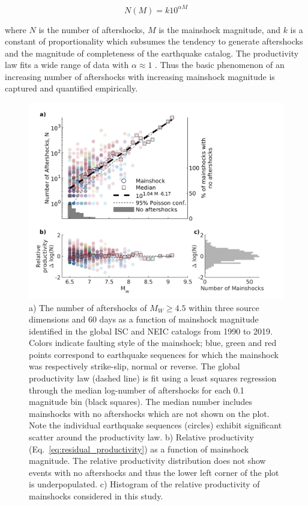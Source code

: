 \documentclass[draft]{agujournal2018}
\begin{document}
\begin{linenomath*}
\begin{equation}\label{eq:productivity}
    N(M)=k10^{\alpha M}
\end{equation}
\end{linenomath*}

where $N$ is the number of aftershocks, $M$ is the mainshock magnitude, and $k$ is a constant of proportionality which subsumes the tendency to generate aftershocks and the magnitude of completeness of the earthquake catalog. The productivity law fits a wide range of data with $\alpha\approx1$ \citep{Reasenberg1989, Yamanaka1990scalingshock,  DeArcangelis2016, Kisslinger1996,Tahir2015,Tahir2014Aftershock2005, Page}. Thus the basic phenomenon of an increasing number of aftershocks with increasing mainshock magnitude is captured and quantified empirically.

    \begin{figure}[!ht]
        \centering
        \includegraphics{figures/prod_law.png}
        \caption{a) The number of aftershocks of $M_W\ge4.5$ within three source dimensions and 60 days as a function of mainshock magnitude identified in the global ISC and NEIC catalogs from 1990 to 2019. Colors indicate faulting style of the mainshock; blue, green and red points correspond to earthquake sequences for which the mainshock was respectively strike-slip, normal or reverse. The global productivity law (dashed line) is fit using a least squares regression through the median log-number of aftershocks for each 0.1 magnitude bin (black squares). The median number includes mainshocks with no aftershocks which are not shown on the plot. Note the individual earthquake sequences (circles) exhibit significant scatter around the productivity law. b) Relative productivity (Eq.~\ref{eq:residual_productivity}) as a function of mainshock magnitude. The relative productivity distribution does not show events with no aftershocks and thus the lower left corner of the plot is underpopulated. c) Histogram of the relative productivity of mainshocks considered in this study.
        }
        \label{fig:fms_prod}
    \end{figure}
\end{document}
